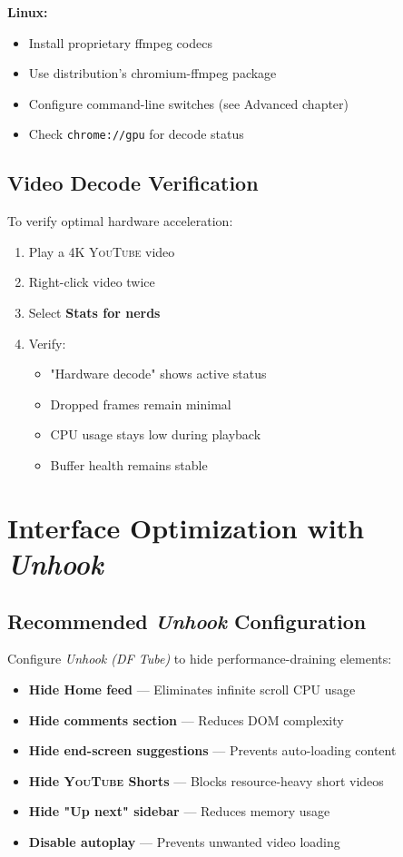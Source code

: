 \documentclass[11pt,a4paper,oneside]{book}
\newcommand{\youtube}{\textsc{YouTube}}
\newcommand{\menupath}[1]{\textbf{\color{darkgray}#1}}
\newcommand{\keystroke}[1]{\texttt{\color{primaryblue}#1}}
\newcommand{\extension}[1]{\textit{\color{primaryblue}#1}}
\begin{document}
\textbf{Linux:}
\begin{itemize}
    \item Install proprietary ffmpeg codecs
    \item Use distribution's chromium-ffmpeg package
    \item Configure command-line switches (see Advanced chapter)
    \item Check \keystroke{chrome://gpu} for decode status
\end{itemize}

\subsection{Video Decode Verification}

To verify optimal hardware acceleration:

\begin{enumerate}
    \item Play a 4K \youtube{} video
    \item Right-click video twice
    \item Select \menupath{Stats for nerds}
    \item Verify:
    \begin{itemize}
        \item "Hardware decode" shows active status
        \item Dropped frames remain minimal
        \item CPU usage stays low during playback
        \item Buffer health remains stable
    \end{itemize}
\end{enumerate}

\section{Interface Optimization with \extension{Unhook}}

\subsection{Recommended \extension{Unhook} Configuration}

Configure \extension{Unhook (DF Tube)} to hide performance-draining elements:

\begin{itemize}
    \item \textbf{Hide Home feed} — Eliminates infinite scroll CPU usage
    \item \textbf{Hide comments section} — Reduces DOM complexity
    \item \textbf{Hide end-screen suggestions} — Prevents auto-loading content
    \item \textbf{Hide \youtube{} Shorts} — Blocks resource-heavy short videos
    \item \textbf{Hide "Up next" sidebar} — Reduces memory usage
    \item \textbf{Disable autoplay} — Prevents unwanted video loading
\end{itemize}
\end{document}
